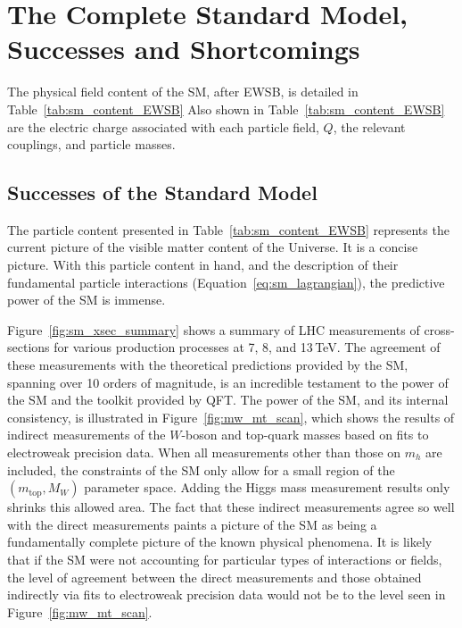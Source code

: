 \section{The Complete Standard Model, Successes and Shortcomings}
\label{sec:final_sm_description}

The physical field content of the SM, after EWSB, is detailed in Table~\ref{tab:sm_content_EWSB}
Also shown in Table~\ref{tab:sm_content_EWSB} are the electric charge associated with each
particle field, $Q$, the relevant couplings, and particle masses.



%
%

\subsection{Successes of the Standard Model}
\label{sec:sm_successes}

The particle content presented in Table~\ref{tab:sm_content_EWSB} represents the current
picture of the visible matter content of the Universe.
It is a concise picture.
With this particle content in hand, and the description of their fundamental particle interactions (Equation~\ref{eq:sm_lagrangian}),
the predictive power of the SM is immense.

Figure~\ref{fig:sm_xsec_summary} shows a summary of LHC measurements of cross-sections
for various production processes at 7, 8, and 13\,TeV.
The agreement of these measurements with the theoretical predictions provided by the SM, spanning over 10 orders of magnitude,
is an incredible testament to the power of the SM and the toolkit provided by QFT.
The power of the SM, and its internal consistency, is illustrated in Figure~\ref{fig:mw_mt_scan},
which shows the results of indirect measurements of the $W$-boson and top-quark masses based
on fits to electroweak precision data.
When all measurements other than those on $m_h$ are included, the constraints of the SM
only allow for a small region of the $(m_{\text{top}}, M_W)$ parameter space.
Adding the Higgs mass measurement results only shrinks this allowed area.
The fact that these indirect measurements agree so well with the direct measurements paints a picture
of the SM as being a fundamentally complete picture of the known physical phenomena.
It is likely that if the SM were not accounting for particular types of interactions or fields,
the level of agreement between the direct measurements and those obtained indirectly via
fits to electroweak precision data would not be to the level seen in Figure~\ref{fig:mw_mt_scan}.

